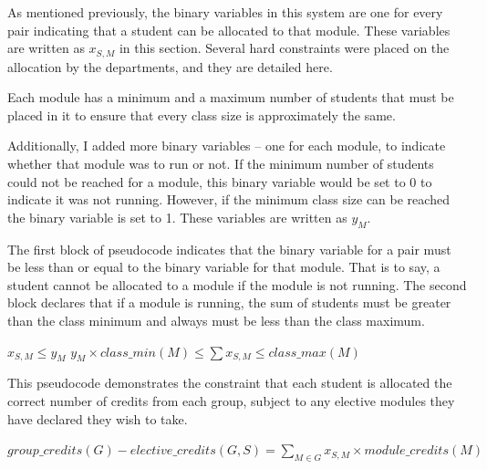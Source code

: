 As mentioned previously, the binary variables in this system are one for every
\studmod pair indicating that a student can be allocated to that
module. These variables are written as $x_{S,M}$ in this section. Several hard
constraints were placed on the allocation by the departments, and they are
detailed here.


Each module has a minimum and a maximum number of students that must be placed
in it to ensure that every class size is approximately the same.

Additionally, I added more binary variables -- one for each module, to
indicate whether that module was to run or not. If the minimum number of
students could not be reached for a module, this binary variable would be set
to 0 to indicate it was not running. However, if the minimum class size can be
reached the binary variable is set to 1. These variables are written as
$y_{M}$.

The first block of pseudocode indicates that the binary variable for a
\studmod pair must be less than or equal to the binary variable
for that module. That is to say, a student cannot be allocated to a module if
the module is not running. The second block declares that if a module is
running, the sum of students must be greater than the class minimum and always
must be less than the class maximum.

\begin{spacing}{1.6}
\begin{algorithmic}
  \STATE $x_{S,M} \leq y_{M}$
\ENDFOR
{}
  \STATE $y_{M} \times class\_min(M) \leq \displaystyle\sum x_{S,M} \leq class\_max(M)$
\ENDFOR
\end{algorithmic}
\end{spacing}


This pseudocode demonstrates the constraint that each student is allocated the
correct number of credits from each group, subject to any elective modules
they have declared they wish to take.

\begin{spacing}{1.6}
\begin{algorithmic}
      \STATE $group\_credits(G) - elective\_credits(G,S) = \displaystyle\sum_{M \in G} x_{S,M} \times module\_credits(M)$
    \ENDIF
  \ENDFOR
\ENDFOR
\end{algorithmic}
\end{spacing}

